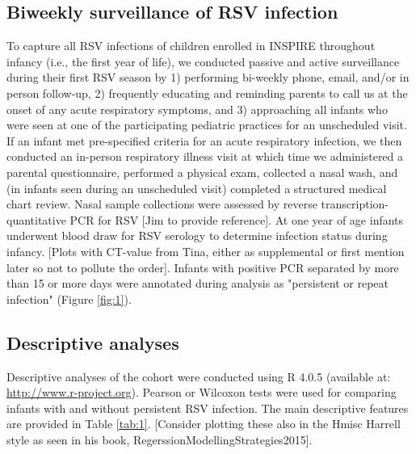 \documentclass{article}
\begin{document}
\subsection{Biweekly surveillance of RSV infection}
To capture all RSV infections of children enrolled in INSPIRE throughout infancy (i.e., the first year of life), we conducted passive and active surveillance during their first RSV season by 1) performing bi-weekly phone, email, and/or in person follow-up, 2) frequently educating and reminding parents to call us at the onset of any acute respiratory symptoms, and 3) approaching all infants who were seen at one of the participating pediatric practices for an unscheduled visit. 
If an infant met pre-specified criteria for an acute respiratory infection, we then conducted an in-person respiratory illness visit at which time we administered a parental questionnaire, performed a physical exam, collected a nasal wash, and (in infants seen during an unscheduled visit) completed a structured medical chart review.
Nasal sample collections were assessed by reverse transcription-quantitative PCR for RSV [Jim to provide reference].
At one year of age infants underwent blood draw for RSV serology to determine infection status during infancy. 
[Plots with CT-value from Tina, either as supplemental or first mention later so not to pollute the order].
Infants with positive PCR separated by more than 15 or more days were annotated during analysis as "persistent or repeat infection"
(Figure \ref{fig:1}).

\subsection{Descriptive analyses}
Descriptive analyses of the cohort were conducted using R 4.0.5 (available at: 
\url{http://www.r-project.org}). 
Pearson or Wilcoxon tests were used for comparing infants with and without persistent RSV infection.
The main descriptive features are provided in 
Table \ref{tab:1}.
[Consider plotting these also in the Hmisc Harrell style as seen in his book, RegerssionModellingStrategies2015].
\end{document}
